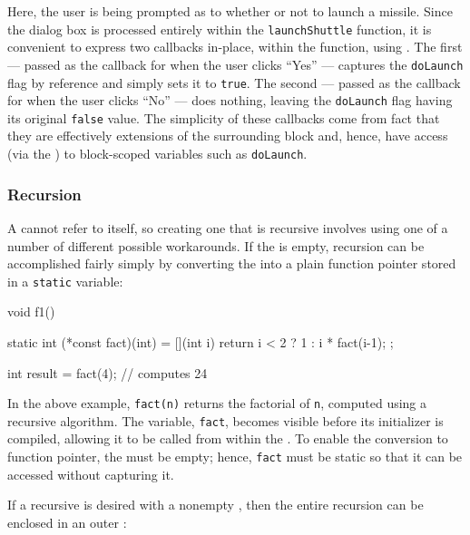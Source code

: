 \noindent Here, the user is being prompted as to whether or not to launch a
missile. Since the dialog box is processed entirely within the
\lstinline!launchShuttle! function, it is convenient to express two
callbacks in-place, within the function, using . The first  --- passed as the
callback for when the user clicks ``Yes'' --- captures the
\lstinline!doLaunch! flag by reference and simply sets it to \lstinline!true!.
The second  --- passed as the callback for
when the user clicks ``No'' --- does nothing, leaving the
\lstinline!doLaunch! flag having its original \lstinline!false! value. The
simplicity of these callbacks come from fact that they are effectively
extensions of the surrounding block and, hence, have access (via the
) to block-scoped variables such as
\lstinline!doLaunch!.

\subsubsection[Recursion]{Recursion}\label{recursion}

A  cannot refer to itself, so creating one
that is recursive involves using one of a number of different possible
workarounds. If the  is empty, recursion can be
accomplished fairly simply by converting the 
into a plain function pointer stored in a \lstinline!static! variable:

\begin{emcppslisting}
void f1()
{
    static int (*const fact)(int) = [](int i)
    {
        return i < 2 ? 1 : i * fact(i-1);
    };

    int result = fact(4);  // computes 24
}
\end{emcppslisting}


\noindent In the above example, \lstinline!fact(n)! returns the factorial of
\lstinline!n!, computed using a recursive algorithm. The variable,
\lstinline!fact!, becomes visible before its initializer is compiled,
allowing it to be called from within the . To
enable the conversion to function pointer, the 
must be empty; hence, \lstinline!fact! must be static so that it can be
accessed without capturing it.

If a recursive  is desired with a nonempty
, then the entire recursion can be enclosed in an
outer :

